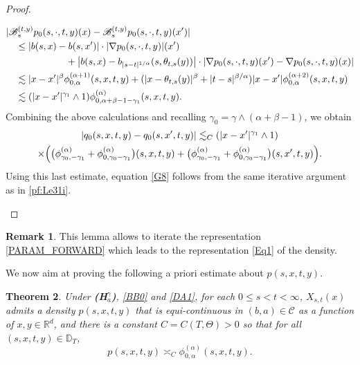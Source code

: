 \documentclass[11pt]{article}
\numberwithin{equation}{section}\providecommand{\asymp}{\mathrel{\sim}}
\theoremstyle{plain}
\newtheorem{theorem}{Theorem}[section]
\theoremstyle{definition}
\newtheorem{remark}[theorem]{Remark}
\newcommand\mD{\mathbb{D}}
\newcommand\mR{\mathbb{R}}
\newcommand\1{{\mathbf{1}}}
\newcommand\sB{{\mathscr B}}
\newcommand\sC{{\mathscr C}}
\begin{document}
\begin{proof}
\begin{enumerate}
\begin{align*}
&|\sB^{(t,y)}_{s} p_0(s,\cdot,t,y)(x)-\sB^{(t,y)}_{s} p_0(s,\cdot,t,y)(x')|\\
&\quad\leq |b(s,x)-b(s,x')|\cdot|\nabla p_0(s,\cdot,t,y)|(x')
\\&\hspace*{2.2cm}+\big|b(s,x)-b_{|s-t|^{1/\alpha}}(s, \theta_{t,s}(y))\big|
\cdot |\nabla p_0(s,\cdot,t,y)(x')-\nabla p_0(s,\cdot,t,y)(x)|
\\&\quad\lesssim|x-x'|^\beta\phi^{(\alpha+1)}_{0,\alpha}(s,x,t,y)+(|x-\theta_{t,s}(y)|^\beta+|t-s|^{\beta/\alpha})|x-x'|\phi^{(\alpha+2)}_{0,\alpha}(s,x,t,y)
\\&\quad\lesssim(|x-x'|^{\gamma_1}\wedge 1)\phi^{(\alpha)}_{0,\alpha+\beta-1-\gamma_1}(s,x,t,y).
\end{align*}
Combining the above calculations and recalling $\gamma_0=\gamma\wedge(\alpha+\beta-1)$, we obtain
\begin{multline*}
|q_0(s,x,t,y)-q_0(s,x',t,y)|\lesssim_C(|x-x'|^{\gamma_1}\wedge1)
\\\times\Bigl(\bigl(\phi^{(\alpha)}_{\gamma_0,-\gamma_1}+\phi^{(\alpha)}_{0,\gamma_0-\gamma_1}\bigr)(s,x,t,y)
+\bigl(\phi^{(\alpha)}_{\gamma_0,-\gamma_1}+\phi^{(\alpha)}_{0,\gamma_0-\gamma_1}\bigr)(s,x',t,y)\Bigr).
\end{multline*}
Using this last estimate, equation \eqref{G8} follows from the same iterative argument as in \eqref{pf:Le31i}.\qedhere
\end{enumerate}
\end{proof}
\begin{remark}
This lemma allows to iterate the representation \eqref{PARAM_FORWARD} which leads to the representation \eqref{Eq1} of the density.
\end{remark}
We now aim at proving the following a priori estimate about $p(s,x,t,y)$.
\begin{theorem}\label{T8}
Under {\bf (H$^\gamma_a$)}, \eqref{BB0} and \eqref{DA1}, for each $0\leq s<t<\infty$,
$X_{s,t}(x)$ admits a density $p(s,x,t,y)$ that is equi-continuous in $(b,a)\in\sC$ as a function of $x,y\in\mR^d$,
and there is a constant $C=C(T,\Theta)>0$ so that for all $(s,x,t,y)\in\mD_T$,
\begin{equation*}%
p(s,x,t,y)\asymp_C \phi^{(\alpha)}_{0,\alpha}(s,x,t,y).
\end{equation*}
\end{theorem}
\end{document}
